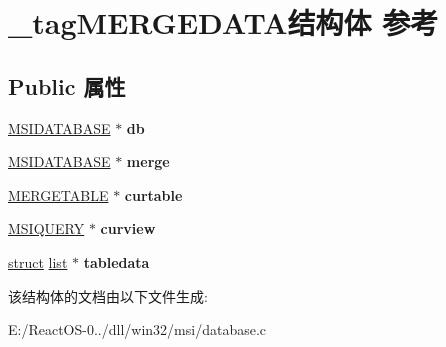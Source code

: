 \hypertarget{struct__tag_m_e_r_g_e_d_a_t_a}{}\section{\+\_\+tag\+M\+E\+R\+G\+E\+D\+A\+T\+A结构体 参考}
\label{struct__tag_m_e_r_g_e_d_a_t_a}
\subsection*{Public 属性}
\begin{DoxyCompactItemize}
\item 
\mbox{\label{struct__tag_m_e_r_g_e_d_a_t_a_ab08e11408f759d13a26710a2e8b97599}} 
\hyperlink{structtag_m_s_i_d_a_t_a_b_a_s_e}{M\+S\+I\+D\+A\+T\+A\+B\+A\+SE} $\ast$ {\bfseries db}
\item 
\mbox{\label{struct__tag_m_e_r_g_e_d_a_t_a_ab90a10a2cd7569740d39ebf828d32c05}} 
\hyperlink{structtag_m_s_i_d_a_t_a_b_a_s_e}{M\+S\+I\+D\+A\+T\+A\+B\+A\+SE} $\ast$ {\bfseries merge}
\item 
\mbox{\label{struct__tag_m_e_r_g_e_d_a_t_a_abaa86f2bd6f5d08a3cc88315dc8e2a71}} 
\hyperlink{struct__tag_m_e_r_g_e_t_a_b_l_e}{M\+E\+R\+G\+E\+T\+A\+B\+LE} $\ast$ {\bfseries curtable}
\item 
\mbox{\label{struct__tag_m_e_r_g_e_d_a_t_a_af14e5563118e5db03e3045b116424ece}} 
\hyperlink{structtag_m_s_i_q_u_e_r_y}{M\+S\+I\+Q\+U\+E\+RY} $\ast$ {\bfseries curview}
\item 
\mbox{\label{struct__tag_m_e_r_g_e_d_a_t_a_a91064dcfd8584241fb1584ea1a25c5f6}} 
\hyperlink{interfacestruct}{struct} \hyperlink{classlist}{list} $\ast$ {\bfseries tabledata}
\end{DoxyCompactItemize}


该结构体的文档由以下文件生成\+:\begin{DoxyCompactItemize}
\item 
E\+:/\+React\+O\+S-\/0../dll/win32/msi/database.\+c\end{DoxyCompactItemize}
